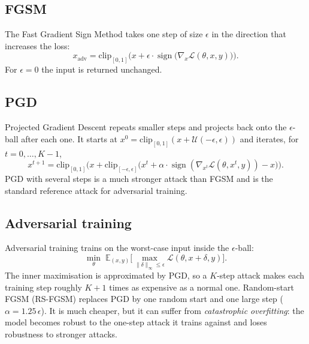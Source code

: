 \documentclass[a4paper,11pt]{article}
\begin{document}
\subsection{FGSM}

The Fast Gradient Sign Method \cite{Goodfellow:15} takes one step of size
$\epsilon$ in the direction that increases the loss:
\begin{equation}
x_{\mathrm{adv}} = \mathrm{clip}_{[0,1]}\Big(x + \epsilon \cdot
\operatorname{sign}\big(\nabla_x \mathcal{L}(\theta, x, y)\big)\Big).
\end{equation}
For $\epsilon = 0$ the input is returned unchanged.

\subsection{PGD}

Projected Gradient Descent \cite{Madry:18} repeats smaller steps and
projects back onto the $\epsilon$-ball after each one. It starts at
$x^0 = \mathrm{clip}_{[0,1]}(x + \mathcal{U}(-\epsilon,\epsilon))$ and
iterates, for $t = 0,\dots,K-1$,
\begin{equation}
x^{t+1} = \mathrm{clip}_{[0,1]}\Big( x + \mathrm{clip}_{[-\epsilon,\epsilon]}
\big( x^t + \alpha \cdot \operatorname{sign}(\nabla_{x^t}
\mathcal{L}(\theta, x^t, y)) - x \big) \Big).
\end{equation}
PGD with several steps is a much stronger attack than FGSM and is the
standard reference attack for adversarial training.

\subsection{Adversarial training}

Adversarial training \cite{Madry:18} trains on the worst-case input
inside the $\epsilon$-ball:
\begin{equation}
\min_\theta \; \mathbb{E}_{(x,y)} \Big[ \max_{\|\delta\|_\infty \le \epsilon}
\mathcal{L}(\theta, x+\delta, y) \Big].
\end{equation}
The inner maximisation is approximated by PGD, so a $K$-step attack makes
each training step roughly $K+1$ times as expensive as a normal one.
Random-start FGSM (RS-FGSM) \cite{Wong:20} replaces PGD by one random
start and one large step ($\alpha = 1.25\,\epsilon$). It is much cheaper,
but it can suffer from \emph{catastrophic overfitting}: the model becomes
robust to the one-step attack it trains against and loses robustness to
stronger attacks.
\end{document}
